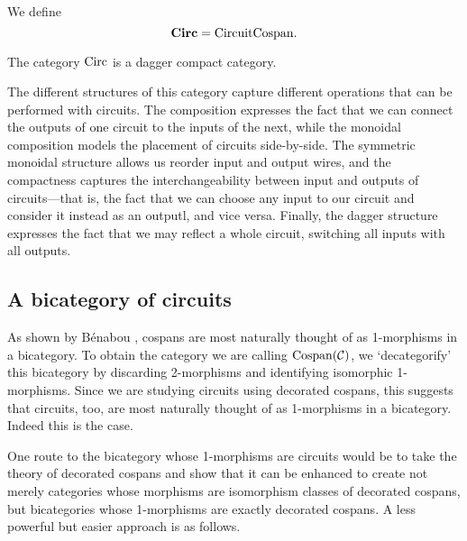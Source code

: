 \begin{definition}
  We define
  \[
    \mbox{{\bf \boldmath Circ}} = \mathrm{CircuitCospan} .
  \]
\end{definition}

\begin{corollary}
The category $\mathrm{Circ}$ is a dagger compact category. 
\end{corollary}

The different structures of this category capture different operations that can
be performed with circuits. The composition expresses the fact that we can
connect the outputs of one circuit to the inputs of the next, while the monoidal
composition models the placement of circuits side-by-side. The symmetric
monoidal structure allows us reorder input and output wires, and the compactness
captures the interchangeability between input and outputs of
circuits---that is, the fact that we can choose any input to our
circuit and consider it instead as an outputl, and vice versa.  Finally, the
dagger structure expresses the fact that we may reflect a whole circuit, switching
all inputs with all outputs.

\subsection{A bicategory of circuits}

As shown by B\'enabou \cite{Be}, cospans are most naturally thought of as
1-morphisms in a bicategory.  To obtain the category we are calling
$\mathrm{Cospan}(\mathcal C)$, we `decategorify' this bicategory by discarding
2-morphisms and identifying isomorphic 1-morphisms. Since we are studying
circuits using decorated cospans, this suggests that circuits, too, are most
naturally thought of as 1-morphisms in a bicategory.  Indeed this is the case.  

One route to the bicategory whose 1-morphisms are circuits would be to take
the theory of decorated cospans \cite{Fon} and show that it can be enhanced to
create not merely categories whose morphisms are isomorphism classes of
decorated cospans, but bicategories whose 1-morphisms are exactly decorated
cospans.  A less powerful but easier approach is as follows.

